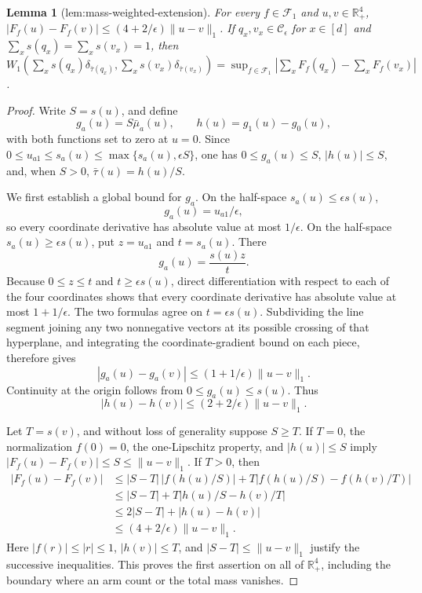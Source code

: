 \documentclass{article}
\newtheorem{lemma}{Lemma}
\begin{document}
\begin{lemma}[lem:mass-weighted-extension]\label{lem:mass-weighted-extension}
For every \(f\in\mathcal F_1\) and \(u,v\in\mathbb R_+^4\), \(|F_f(u)-F_f(v)|\le(4+2/\epsilon)\lVert u-v\rVert_1\). If \(q_x,v_x\in\mathcal C_\epsilon\) for \(x\in[d]\) and \(\sum_xs(q_x)=\sum_xs(v_x)=1\), then \(W_1(\sum_xs(q_x)\delta_{\bar\tau(q_x)},\sum_xs(v_x)\delta_{\bar\tau(v_x)})=\sup_{f\in\mathcal F_1}|\sum_xF_f(q_x)-\sum_xF_f(v_x)|\).
\end{lemma}
\begin{proof}
Write \(S=s(u)\), and define
\[
g_a(u)=S\bar\mu_a(u),\qquad h(u)=g_1(u)-g_0(u),
\]
with both functions set to zero at \(u=0\).  Since \(0\leq u_{a1}\leq s_a(u)\leq\max\{s_a(u),\epsilon S\}\), one has \(0\leq g_a(u)\leq S\), \(|h(u)|\leq S\), and, when \(S>0\), \(\bar\tau(u)=h(u)/S\).

We first establish a global bound for \(g_a\).  On the half-space \(s_a(u)\leq\epsilon s(u)\),
\[
g_a(u)=u_{a1}/\epsilon,
\]
so every coordinate derivative has absolute value at most \(1/\epsilon\).  On the half-space \(s_a(u)\geq\epsilon s(u)\), put \(z=u_{a1}\) and \(t=s_a(u)\).  There
\[
g_a(u)=\frac{s(u)z}{t}.
\]
Because \(0\leq z\leq t\) and \(t\geq\epsilon s(u)\), direct differentiation with respect to each of the four coordinates shows that every coordinate derivative has absolute value at most \(1+1/\epsilon\).  The two formulas agree on \(t=\epsilon s(u)\).  Subdividing the line segment joining any two nonnegative vectors at its possible crossing of that hyperplane, and integrating the coordinate-gradient bound on each piece, therefore gives
\[
|g_a(u)-g_a(v)|\leq(1+1/\epsilon)\lVert u-v\rVert_1.
\]
Continuity at the origin follows from \(0\leq g_a(u)\leq s(u)\).  Thus
\[
|h(u)-h(v)|\leq(2+2/\epsilon)\lVert u-v\rVert_1.
\]

Let \(T=s(v)\), and without loss of generality suppose \(S\geq T\).  If \(T=0\), the normalization \(f(0)=0\), the one-Lipschitz property, and \(|h(u)|\leq S\) imply \(|F_f(u)-F_f(v)|\leq S\leq\lVert u-v\rVert_1\).  If \(T>0\), then
\[
\begin{aligned}
|F_f(u)-F_f(v)|
&\leq |S-T|\,|f(h(u)/S)|
   +T\left|f(h(u)/S)-f(h(v)/T)\right|\\
&\leq |S-T|+T\left|h(u)/S-h(v)/T\right|\\
&\leq2|S-T|+|h(u)-h(v)|\\
&\leq(4+2/\epsilon)\lVert u-v\rVert_1.
\end{aligned}
\]
Here \(|f(r)|\leq|r|\leq1\), \(|h(v)|\leq T\), and \(|S-T|\leq\lVert u-v\rVert_1\) justify the successive inequalities.  This proves the first assertion on all of \(\mathbb R_+^4\), including the boundary where an arm count or the total mass vanishes.


\end{proof}
\end{document}
